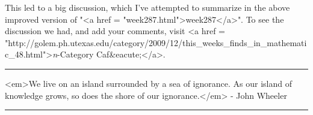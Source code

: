 This led to a big discussion, which I've attempted to summarize in the
above improved version of "<a href =
"week287.html">week287</a>".  To see the discussion we had, and
add your comments, visit <a href =
"http://golem.ph.utexas.edu/category/2009/12/this_weeks_finds_in_mathematic_48.html">\emph{n}-Category
Caf&eacute;</a>.


\par\noindent\rule{\textwidth}{0.4pt}

<em>We live on an island surrounded by a sea of ignorance.  As our island
of knowledge grows, so does the shore of our ignorance.</em> - John Wheeler

\par\noindent\rule{\textwidth}{0.4pt}

